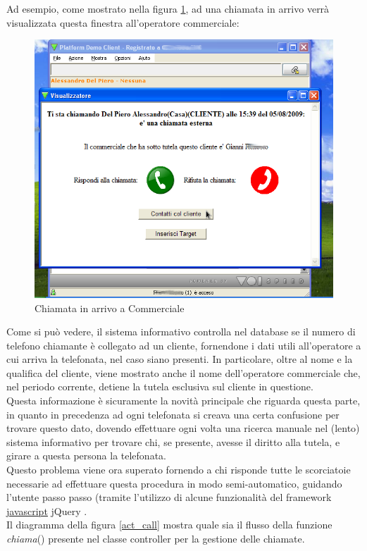 \newpage
\noindent
Ad esempio, come mostrato nella figura \ref{chiamata_comm}, ad una chiamata in arrivo verr\`a visualizzata questa finestra all'operatore commerciale:

\begin{figure}[!ht]
\centering
  \includegraphics[scale=0.8]{./images/chiamata_commerciale.png}
\caption{Chiamata in arrivo a Commerciale}
\label{chiamata_comm}
\end{figure}

\noindent
Come si pu\`o vedere, il sistema informativo controlla nel database se il numero di telefono chiamante \`e collegato ad un cliente, fornendone i dati utili all'operatore a cui arriva la telefonata, nel caso siano presenti. In particolare, oltre al nome e la qualifica del cliente, viene mostrato anche il nome dell'operatore commerciale che, nel periodo corrente, detiene la tutela esclusiva sul cliente in questione. \\
Questa informazione \`e sicuramente la novit\`a principale che riguarda questa parte, in quanto in precedenza ad ogni telefonata si creava una certa confusione per trovare questo dato, dovendo effettuare ogni volta una ricerca manuale nel (lento) sistema informativo per trovare chi, se presente, avesse il diritto alla tutela, e girare a questa persona la telefonata. \\
Questo problema viene ora superato fornendo a chi risponde tutte le scorciatoie necessarie ad effettuare questa procedura in modo semi-automatico, guidando l'utente passo passo (tramite l'utilizzo di alcune funzionalit\`a del framework \hyperlink{javascript}{\underline{javascript}} jQuery \cite{jquery}. \\
Il diagramma della figura \ref{act_call} mostra quale sia il flusso della funzione \textit{chiama}() presente nel classe controller per la gestione delle chiamate. 

